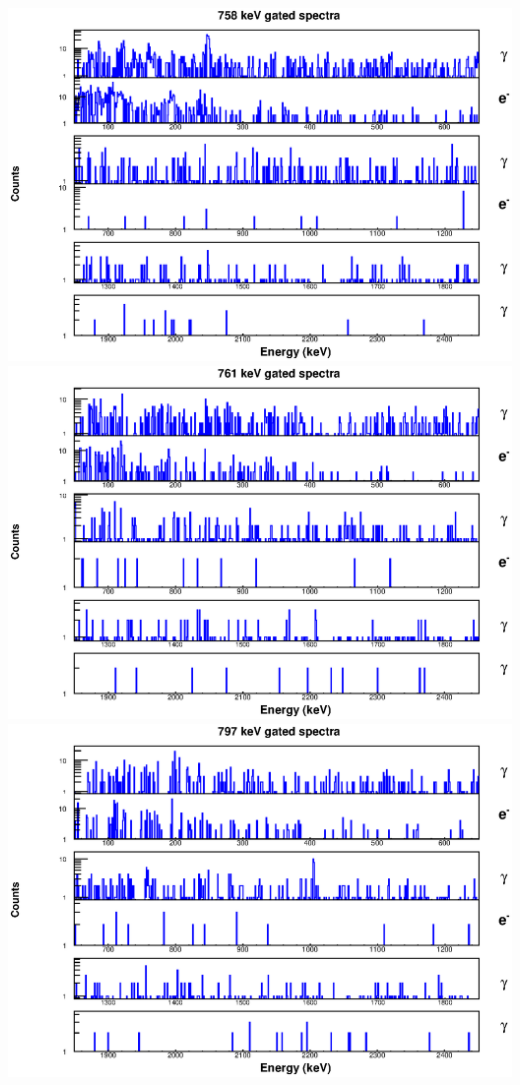 \includegraphics[scale=0.8]{154Gd_Appendix/758_combined.eps}
\includegraphics[scale=0.8]{154Gd_Appendix/761_combined.eps}
\includegraphics[scale=0.8]{154Gd_Appendix/797_combined.eps}
